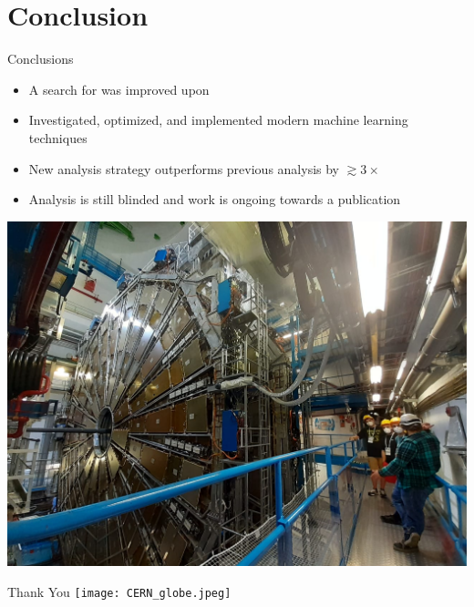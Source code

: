 \documentclass[aspectratio=169,xcolor=table]{beamer}
\begin{document}
\section{Conclusion }

  \begin{frame}[t]{Conclusions}
    \begin{itemize}
      \item A search for \HpmLong was improved upon
      \item Investigated, optimized, and implemented modern machine learning techniques 
      \item New analysis strategy outperforms previous analysis by $\gtrsim 3\times$
      \item Analysis is still blinded and work is ongoing towards a publication
    \end{itemize}
    \centering
    \includegraphics[height=.5\textheight,keepaspectratio=true]{ATLAS_Tour.jpg}
  \end{frame}

  \begin{frame}{Thank You}
    \centering
    \texttt{[image: CERN\_globe.jpeg]}
  \end{frame}

  \subsection { }

\appendix
\end{document}
